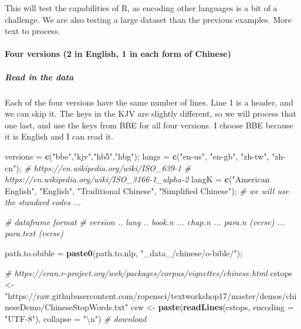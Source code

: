 \documentclass[
]{article}
\newenvironment{Shaded}{\begin{snugshade}}{\end{snugshade}}
\newcommand{\CharTok}[1]{\textcolor[rgb]{0.31,0.60,0.02}{#1}}
\newcommand{\CommentTok}[1]{\textcolor[rgb]{0.56,0.35,0.01}{\textit{#1}}}
\newcommand{\DataTypeTok}[1]{\textcolor[rgb]{0.13,0.29,0.53}{#1}}
\newcommand{\KeywordTok}[1]{\textcolor[rgb]{0.13,0.29,0.53}{\textbf{#1}}}
\newcommand{\NormalTok}[1]{#1}
\newcommand{\StringTok}[1]{\textcolor[rgb]{0.31,0.60,0.02}{#1}}
\begin{document}
This will test the capabilities of R, as encoding other languages is a
bit of a challenge. We are also testing a large dataset than the
previous examples. More text to process.

\hypertarget{four-versions-2-in-english-1-in-each-form-of-chinese}{%
\paragraph{Four versions (2 in English, 1 in each form of
Chinese)}\label{four-versions-2-in-english-1-in-each-form-of-chinese}}

\hypertarget{read-in-the-data}{%
\subparagraph{Read in the data}\label{read-in-the-data}}

Each of the four versions have the same number of lines. Line 1 is a
header, and we can skip it. The keys in the KJV are slightly different,
so we will process that one last, and use the keys from BBE for all four
versions. I choose BBE because it is English and I can read it.

\begin{Shaded}
\begin{Highlighting}[]
\NormalTok{versions =}\StringTok{ }\KeywordTok{c}\NormalTok{(}\StringTok{"bbe"}\NormalTok{,}\StringTok{"kjv"}\NormalTok{,}\StringTok{"hb5"}\NormalTok{,}\StringTok{"hbg"}\NormalTok{);}
\NormalTok{langs    =}\StringTok{ }\KeywordTok{c}\NormalTok{(}\StringTok{"en{-}us"}\NormalTok{, }\StringTok{"en{-}gb"}\NormalTok{, }\StringTok{"zh{-}tw"}\NormalTok{, }\StringTok{"zh{-}cn"}\NormalTok{);}
\CommentTok{\# https://en.wikipedia.org/wiki/ISO\_639{-}1}
\CommentTok{\# https://en.wikipedia.org/wiki/ISO\_3166{-}1\_alpha{-}2}
\NormalTok{langK    =}\StringTok{ }\KeywordTok{c}\NormalTok{(}\StringTok{"American English"}\NormalTok{, }\StringTok{"English"}\NormalTok{, }\StringTok{"Traditional Chinese"}\NormalTok{, }\StringTok{"Simplified Chinese"}\NormalTok{);}
\CommentTok{\# we will use the standard codes ...}


\CommentTok{\# dataframe format}
\CommentTok{\# version .. lang .. book.n ... chap.n ... para.n (verse) ... para.text (verse)}

\NormalTok{path.to.obible =}\StringTok{ }\KeywordTok{paste0}\NormalTok{(path.to.nlp, }\StringTok{"\_data\_/chinese/o{-}bible/"}\NormalTok{);}
\end{Highlighting}
\end{Shaded}

\begin{Shaded}
\begin{Highlighting}[]
\CommentTok{\# https://cran.r{-}project.org/web/packages/corpus/vignettes/chinese.html}
\NormalTok{cstops \textless{}{-}}\StringTok{ "https://raw.githubusercontent.com/ropensci/textworkshop17/master/demos/chineseDemo/ChineseStopWords.txt"}
\NormalTok{csw \textless{}{-}}\StringTok{ }\KeywordTok{paste}\NormalTok{(}\KeywordTok{readLines}\NormalTok{(cstops, }\DataTypeTok{encoding =} \StringTok{"UTF{-}8"}\NormalTok{), }\DataTypeTok{collapse =} \StringTok{"}\CharTok{\textbackslash{}n}\StringTok{"}\NormalTok{) }\CommentTok{\# download}
\end{Highlighting}
\end{Shaded}
\end{document}
